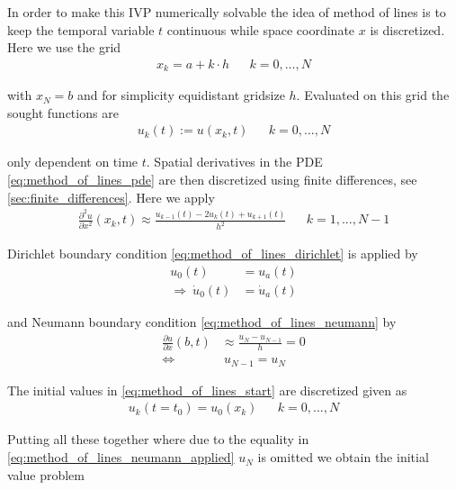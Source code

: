 \documentclass{scrartcl}[12pt, halfparskip]
\numberwithin{equation}{section}
\numberwithin{figure}{section}
\numberwithin{table}{section}
\begin{document}
In order to make this IVP numerically solvable the idea of method of lines is to keep the temporal variable $t$ continuous while space coordinate $x$ is discretized. Here we use the grid
\begin{align}
	x_k = a + k \cdot h & & k=0,...,N
\end{align}

with $x_{N} = b$ and for simplicity equidistant gridsize $h$. Evaluated on this grid the sought functions are
\begin{align}
	u_k(t) := u(x_k,t) & & k=0,...,N
\end{align}

only dependent on time $t$. Spatial derivatives in the PDE \eqref{eq:method_of_lines_pde} are then discretized using finite differences, see \cref{sec:finite_differences}. Here we apply
\begin{align}
	\frac{\partial^2 u}{\partial x^2}(x_k,t) \approx \frac{u_{k-1}(t) - 2 u_k(t) + u_{k+1}(t)}{h^2} & & k=1,...,N-1
	\label{eq:discretized_second_derivative}
\end{align}

Dirichlet boundary condition \cref{eq:method_of_lines_dirichlet} is applied by
\begin{align}
	u_0(t) & = u_a(t) \\
	\Rightarrow \ \dot{u}_0(t) & = \dot{u}_a(t)
\end{align}

and Neumann boundary condition \cref{eq:method_of_lines_neumann} by
\begin{align}
	\frac{\partial u}{\partial x}(b,t) & \approx \frac{u_{N} - u_{N-1}}{h} = 0 \nonumber \\
	\Leftrightarrow & \ u_{N-1} = u_{N} \label{eq:method_of_lines_neumann_applied}
\end{align}

The initial values in \cref{eq:method_of_lines_start} are discretized given as
\begin{align}
	u_k(t=t_0) = u_0(x_k) & & k = 0,...,N
\end{align}

Putting all these together where due to the equality in \cref{eq:method_of_lines_neumann_applied} $u_{N}$ is omitted we obtain the initial value problem 
\end{document}
